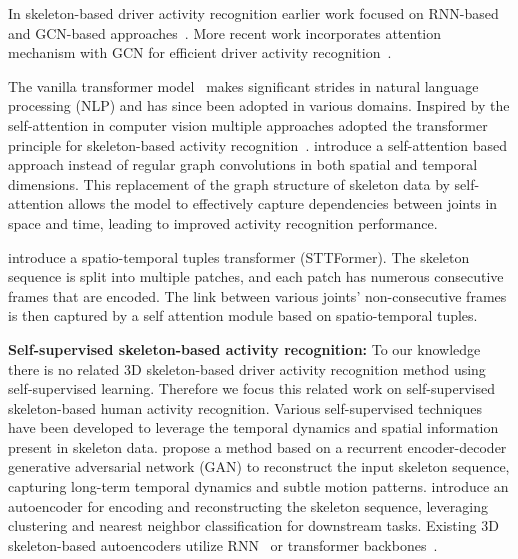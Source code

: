 In skeleton-based driver activity recognition earlier work focused on RNN-based~\cite{drive_and_act_2019_iccv} and GCN-based approaches~\cite{martin_dynamic_2020}. More recent work incorporates attention mechanism with GCN for efficient driver activity recognition~\cite{li2024incomplete}.

The vanilla transformer model~\cite{vaswani2017attention} makes significant strides in natural language processing (NLP) and has since been adopted in various domains. Inspired by the self-attention in computer vision multiple approaches adopted the transformer principle for skeleton-based activity recognition~\cite{qiu2022spatio, wu2022skeletonmae, cheng_hierarchical_2021, kim_global-local_2022}. \textcite{plizzari2021skeleton} introduce a self-attention based approach instead of regular graph convolutions in both spatial and temporal dimensions. 
This replacement of the graph structure of skeleton data by self-attention allows the model to effectively capture dependencies between joints in space and time, leading to improved activity recognition performance.

\textcite{qiu2022spatio} introduce a spatio-temporal tuples transformer (STTFormer). The skeleton sequence is split into multiple patches, and each patch has numerous consecutive frames that are encoded. The link between various joints’ non-consecutive frames is then captured by a self attention module based on spatio-temporal tuples. 

\textbf{Self-supervised skeleton-based activity recognition:} To our knowledge there is no related 3D skeleton-based driver activity recognition method using self-supervised learning. Therefore we focus this related work on self-supervised skeleton-based human activity recognition. Various self-supervised techniques have been developed to leverage the temporal dynamics and spatial information present in skeleton data. \textcite{zheng2018unsupervised} propose a method based on a recurrent encoder-decoder generative adversarial network (GAN) to reconstruct the input skeleton sequence, capturing long-term temporal dynamics and subtle motion patterns. \textcite{su2020predict} introduce an autoencoder for encoding and reconstructing the skeleton sequence, leveraging clustering and nearest neighbor classification for downstream tasks. Existing 3D skeleton-based autoencoders utilize RNN~\cite{su2020predict, wu2022bi, rao_augmented_2021} or transformer backbones~\cite{Lerch_2024_WACV, wu2022skeletonmae}.

